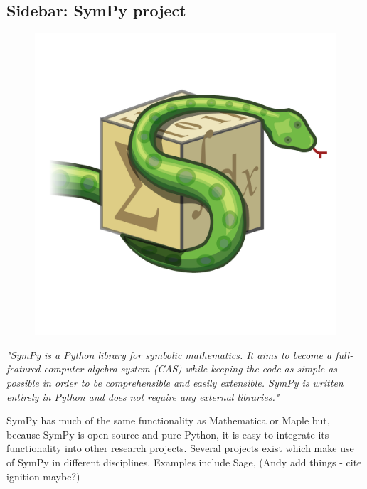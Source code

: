 \subsection{Sidebar: SymPy project}
\begin{figure}
\vspace{-0pt}
\centering
\includegraphics[width=.18\textwidth]{images/logo}
\vspace{-0pt}
\label{fig:}
\vspace{00pt}
\end{figure}
\textit{"SymPy is a Python library for symbolic mathematics. It aims to become a full-featured computer algebra system (CAS) while keeping the code as simple as possible in order to be comprehensible and easily extensible. SymPy is written entirely in Python and does not require any external libraries."}

SymPy has much of the same functionality as Mathematica or Maple but, because SymPy is open source and pure Python, it is easy to integrate its functionality into other research projects. Several projects exist which make use of SymPy in different disciplines. Examples include Sage, (Andy add things - cite ignition maybe?)
